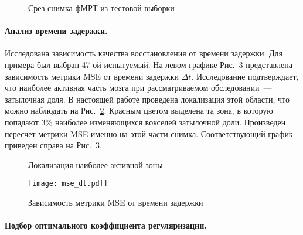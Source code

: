 \documentclass[a4paper, 12pt]{extarticle}
\begin{document}
\begin{figure}[h!]
	\centering
	\hfill
	\hfill
	\caption{Срез снимка фМРТ из тестовой выборки}
	\label{fig:example}
\end{figure}

\paragraph*{Анализ времени задержки.}

Исследована зависимость качества восстановления от времени задержки.
Для примера был выбран 47-ой испытуемый.
На левом графике Рис.~\ref{fig:mse-dt} представлена зависимость метрики MSE
от времени задержки $\Delta t$.
Исследование \citep{anderson2006} подтверждает, что наиболее активная часть мозга
при рассматриваемом обследовании~--- затылочная доля.
В настоящей работе проведена локализация этой области, что можно наблюдать на
Рис.~\ref{fig:local}.
Красным цветом выделена та зона, в которую попадают $3\%$ наиболее 
изменяющихся вокселей затылочной доли.
Произведен пересчет метрики MSE именно на этой части снимка.
Соответствующий график приведен справа на Рис.~\ref{fig:mse-dt}.

\begin{figure}[h!]
	\centering
	\hfill
	\hfill
	\caption{Локализация наиболее активной зоны}
	\label{fig:local}
\end{figure}

\begin{figure}[h!]
	\centering
	\texttt{[image: mse\_dt.pdf]}
	\caption{Зависимость метрики MSE от времени задержки}
	\label{fig:mse-dt}
\end{figure}

\paragraph*{Подбор оптимального коэффициента регуляризации.}
\end{document}
